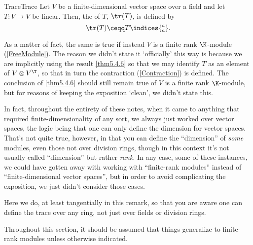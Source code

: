 \begin{dfn}{Trace}{Trace}
	Let $V$ be a finite-dimensional vector space over a field and let $T\colon V\rightarrow V$ be linear.  Then, the  of $T$, $\tr (T)$, is defined by
	\begin{equation}
		\tr (T)\ceqq T\indices{^a_a}.
	\end{equation}
	\begin{rmk}
		As a matter of fact, the same is true if instead $V$ is a finite rank $\K$-module (\cref{FreeModule}).  The reason we didn't state it `officially' this way is because we are implicitly using the result \cref{thm5.4.6} so that we may identify $T$ as an element of $V\otimes V^{\T}$, so that in turn the contraction (\cref{Contraction}) is defined.  The conclusion of \cref{thm5.4.6} should still remain true of $V$ is a finite rank $\K$-module, but for reasons of keeping the exposition `clean', we didn't state this.
		
		In fact, throughout the entirety of these notes, when it came to anything that required finite-dimensionality of any sort, we always just worked over vector spaces, the logic being that one can only define the dimension for vector spaces.  That's not quite true, however, in that you can define the ``dimension'' of \emph{some} modules, even those not over division rings, though in this context it's not usually called ``dimension'' but rather \emph{rank}.  In any case, some of these instances, we could have gotten away with working with ``finite-rank modules'' instead of ``finite-dimensional vector spaces'', but in order to avoid complicating the exposition, we just didn't consider those cases.
		
		Here we do, at least tangentially in this remark, so that you are aware one can define the trace over any ring, not just over fields or division rings.
		
		Throughout this section, it should be assumed that things generalize to finite-rank modules unless otherwise indicated.
	\end{rmk}	
\end{dfn}
